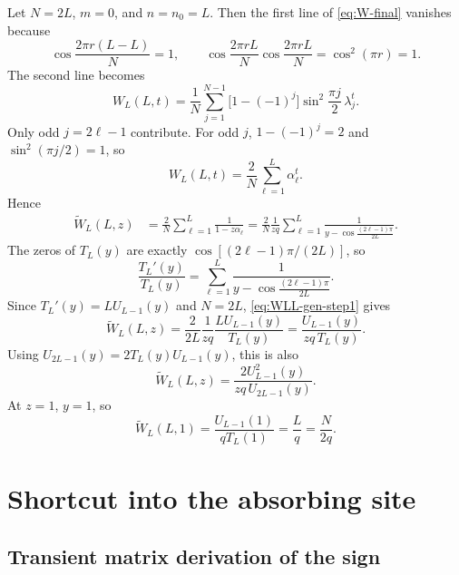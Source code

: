 \documentclass[11pt]{article}
\newcommand{\wt}{\widetilde}
\begin{document}
Let $N=2L$, $m=0$, and $n=n_0=L$.  Then the first line of \eqref{eq:W-final} vanishes because
\begin{equation}
  \cos\frac{2\pi r(L-L)}{N}=1,
  \qquad
  \cos\frac{2\pi rL}{N}\cos\frac{2\pi rL}{N}=\cos^2(\pi r)=1.
\end{equation}
The second line becomes
\begin{equation}
  W_L(L,t)=\frac1N\sum_{j=1}^{N-1}\bigl[1-(-1)^j\bigr]\sin^2\frac{\pi j}{2}\,\lambda_j^t.
\end{equation}
Only odd $j=2\ell-1$ contribute.  For odd $j$, $1-(-1)^j=2$ and
$\sin^2(\pi j/2)=1$, so
\begin{equation}
  W_L(L,t)=\frac{2}{N}\sum_{\ell=1}^{L}\alpha_\ell^t.
  \label{eq:WLL-time}
\end{equation}
Hence
\begin{align}
  \wt W_L(L,z)
  &=\frac{2}{N}\sum_{\ell=1}^{L}\frac{1}{1-z\alpha_\ell}
  =\frac{2}{N}\frac{1}{zq}
  \sum_{\ell=1}^{L}\frac{1}{y-\cos\frac{(2\ell-1)\pi}{2L}}.\label{eq:WLL-gen-step1}
\end{align}
The zeros of $T_L(y)$ are exactly $\cos[(2\ell-1)\pi/(2L)]$, so
\begin{equation}
  \frac{T_L'(y)}{T_L(y)}=\sum_{\ell=1}^{L}
  \frac{1}{y-\cos\frac{(2\ell-1)\pi}{2L}}.
\end{equation}
Since $T_L'(y)=L U_{L-1}(y)$ and $N=2L$, \eqref{eq:WLL-gen-step1} gives
\begin{equation}
  \wt W_L(L,z)=\frac{2}{2L}\frac1{zq}\frac{L U_{L-1}(y)}{T_L(y)}
  =\frac{U_{L-1}(y)}{zq\,T_L(y)}.
\end{equation}
Using $U_{2L-1}(y)=2T_L(y)U_{L-1}(y)$, this is also
\begin{equation}
  \boxed{
  \wt W_L(L,z)=\frac{2U_{L-1}^2(y)}{zq\,U_{2L-1}(y)}.}
  \label{eq:WLL-gen}
\end{equation}
At $z=1$, $y=1$, so
\begin{equation}
  \wt W_L(L,1)=\frac{U_{L-1}(1)}{qT_L(1)}=\frac{L}{q}=\frac{N}{2q}.
\end{equation}

\section{Shortcut into the absorbing site}
\label{sec:shortcut}

\subsection{Transient matrix derivation of the sign}
\end{document}
